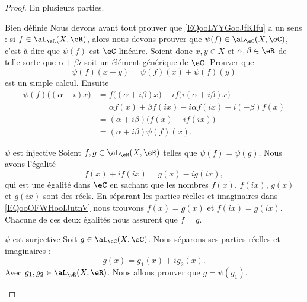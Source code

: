\begin{proof}
    En plusieurs parties.
    \begin{subproof}
        \item[Bien définie]
            Nous devons avant tout prouver que \eqref{EQooLYYGooJfKIfu} a un sens : si \( f\in \aL_{\eR}(X,\eR)\), alors nous devons prouver que \( \psi(f)\in\aL_\eC(X,\eC)\), c'est à dire que \( \psi(f)\) est \( \eC\)-linéaire. Soient donc \( x,y\in X\) et \( \alpha,\beta\in \eR\) de telle sorte que \( \alpha+\beta i\) soit un élément générique de \( \eC\). Prouver que
            \begin{equation}
                \psi(f)(x+y)=\psi(f)(x)+\psi(f)(y)
            \end{equation}
            est un simple calcul. Ensuite
            \begin{subequations}
                \begin{align}
                    \psi(f)\big( (\alpha+i)x \big)&=f\big( (\alpha+i\beta)x \big)-if\big( i(\alpha+i\beta)x \big)\\
                    &=\alpha f(x)+\beta f(ix)-i\alpha f(ix)-i(-\beta)f(x)\\
                    &=(\alpha+i\beta)\big( f(x)-if(ix) \big)\\
                    &=(\alpha+i\beta)\psi(f)(x).
                \end{align}
            \end{subequations}
        \item[\( \psi\) est injective]
            Soient \( f,g\in \aL_{\eR}(X,\eR)\) telles que \( \psi(f)=\psi(g)\). Nous avons l'égalité
            \begin{equation}        \label{EQooOFWHooIJutnV}
                f(x)+if(ix)=g(x)-ig(ix),
            \end{equation}
            qui est une égalité dans \( \eC\) en sachant que les nombres \( f(x)\), \( f(ix)\), \( g(x)\) et \( g(ix)\) sont des réels. En séparant les parties réelles et imaginaires dans \eqref{EQooOFWHooIJutnV} nous trouvons \( f(x)=g(x)\) et \( f(ix)=g(ix)\). Chacune de ces deux égalités nous assurent que \( f=g\).
        \item[\( \psi\) est surjective]
            Soit \( g\in \aL_{\eC}(X,\eC)\). Nous séparons ses parties réelles et imaginaires :
            \begin{equation}
                g(x)=g_1(x)+ig_2(x).
            \end{equation}
            Avec \( g_1,g_2\in \aL_{\eR}(X,\eR)\). Nous allons prouver que \( g=\psi(g_1)\).


\end{subproof}
\end{proof}

